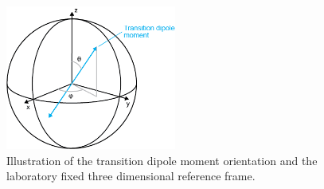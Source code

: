 \documentclass{article}
\begin{document}
\begin{figure}
    \centering
    \includegraphics[width=0.5\textwidth]{figures/angles_theta_phi.png}
    \caption{Illustration of the transition dipole moment orientation and the laboratory fixed three dimensional reference frame.}\label{fig:angles}
\end{figure}

\end{document}
